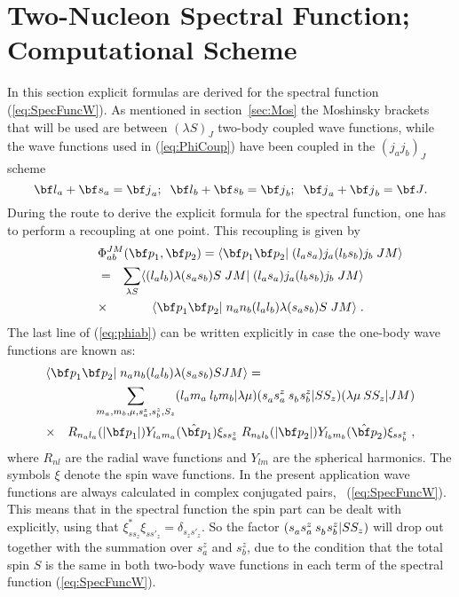 \section{Two-Nucleon Spectral Function; Computational Scheme}
In this section explicit formulas are derived for the spectral function
(\ref{eq:SpecFuncW}).
As mentioned in section~\ref{sec:Mos} the Moshinsky brackets that will 
be used are between $(\lambda S)_J$ two-body coupled wave functions, while
the wave functions used in (\ref{eq:PhiCoup}) have been coupled in the 
 $(j_aj_b)_J$ scheme
%
	\begin{equation} 
		\rvec{l}_a + \rvec{s}_a = \rvec{j}_a ;\;\; 
		\rvec{l}_b + \rvec{s}_b = \rvec{j}_b ;\;\; 
		\rvec{j}_a + \rvec{j}_b = \rvec{J}. 
	\end{equation} 
%
During the route to derive the explicit formula for the spectral function, one
has to perform a recoupling at one point. This recoupling is given by
%
	\begin{eqnarray} 
	\lefteqn{%
		\Phi^{JM}_{ab}(\rvec{p}_1,\rvec{p}_2) 
	= 
		\inp<\rvec{p}_1 \rvec{p}_2| (l_a s_a) j_a (l_b s_b) j_b \; J M>
	} \nonumber \\
	&=&
		\sum_{\lambda S}
		\inp<(l_a l_b) \lambda (s_a s_b)S \; J M |%
		               (l_a s_a) j_a (l_b s_b) j_b \; J M >
	\nonumber \\
	&\times&
		\inp< \rvec{p}_1 \rvec{p}_2 | 
                      n_a n_b (l_a l_b) \lambda (s_a s_b) S \; J M >
	\label{eq:phiab}
	\;.
	\end{eqnarray} 
%
The last line of (\ref{eq:phiab}) can be written explicitly in case
the one-body wave functions are known as:
%
	\begin{eqnarray} 
	\lefteqn{
		\inp< \rvec{p}_1 \rvec{p}_2 | 
                      n_a n_b (l_a l_b) \lambda (s_a s_b) S J M >
	=} 
	\label{eq:coup1}
	\\
	&&
		\sum_{ m_a, m_b, \mu, s^z_a, s^z_b, S_z }
		\CG( l_a, m_a, l_b, m_b, \lambda, \mu )
		\CG( s^{\phantom{z}}_a, s^z_a, s^{\phantom{z}}_b, 
		     s^z_b, S, S_z)
		\CG( \lambda, \mu, S, S_z, J, M )
	\nonumber \\
	&\times&
		R_{n_a l_a}(|\rvec{p}_1|)
		Y_{l_a m_a}(\hat{\rvec{p}}_1)
		\xi_{s s^z_a}
		\;
		R_{n_b l_b}(|\rvec{p}_2|)
		Y_{l_b m_b}(\hat{\rvec{p}}_2) 
		\xi_{s s^z_b}
	\nonumber
	\;,
	\end{eqnarray} 
%
where $R_{nl}$ are the radial wave functions and $Y_{lm}$ are the 
spherical harmonics. The symbols $\xi$ denote the spin wave functions.
In the present application wave functions are always 
calculated in complex conjugated pairs, \cf\ (\ref{eq:SpecFuncW}). 
This means that in the spectral 
function the spin part can be dealt with explicitly, using that 
 $\xi^\ast_{ss^{\phantom{\prime}}_z}\xi^{\phantom{\ast}}_{ss'_z} 
 = \delta_{s^{\phantom{\prime}}_z s'_z}$. 
So the factor 
 $\CG( s^{\phantom{z}}_a, s^z_a, s^{\phantom{z}}_b, s^z_b, S, S_z)$ 
will drop out together with the 
summation over $s^z_a$ and $s^z_b$, due to the condition that the total spin
 $S$ is the same in both two-body wave functions in each term of the spectral 
function (\ref{eq:SpecFuncW}).


